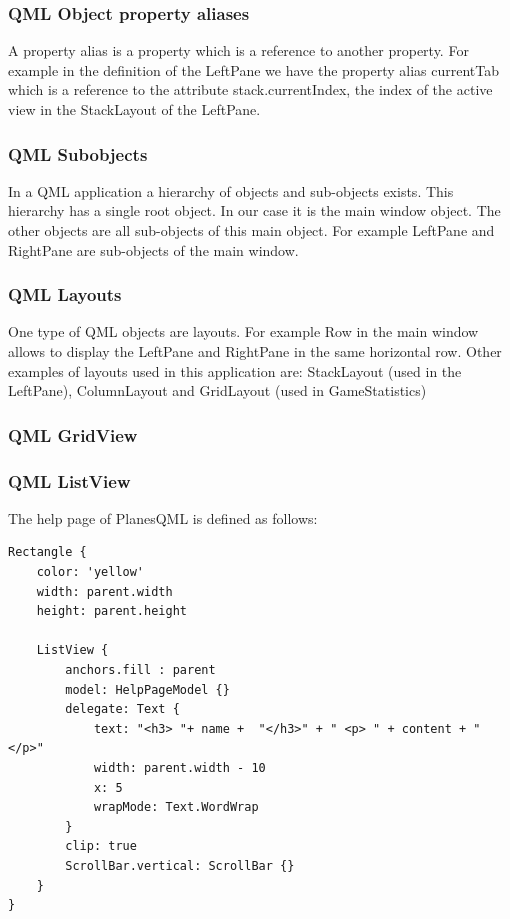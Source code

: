 \subsubsection {QML Object property aliases}

A property alias is a property which is a reference to another property. For example in the definition of the LeftPane we have the property alias currentTab which is a reference to the attribute stack.currentIndex, the index of the active view in the StackLayout of the LeftPane. 

\subsubsection {QML Subobjects}

In a QML application a hierarchy of objects and sub-objects exists. This hierarchy has a single root object. In our case it is the main window object. The other objects are all sub-objects of this main object. 
For example LeftPane and RightPane are sub-objects of the main window. 

\subsubsection {QML Layouts}

One type of QML objects are layouts. For example Row in the main window allows to display the LeftPane and RightPane in the same horizontal row. Other examples of layouts used in this application are: StackLayout (used in the LeftPane), ColumnLayout and GridLayout (used in GameStatistics)

\subsubsection {QML GridView}

\subsubsection {QML ListView}

The help page of PlanesQML is defined as follows:

\begin{lstlisting}
Rectangle {
	color: 'yellow'
	width: parent.width
	height: parent.height
	
	ListView {
		anchors.fill : parent 
		model: HelpPageModel {}
		delegate: Text {
			text: "<h3> "+ name +  "</h3>" + " <p> " + content + " </p>"
			width: parent.width - 10
			x: 5
			wrapMode: Text.WordWrap
		}
		clip: true
		ScrollBar.vertical: ScrollBar {}
	}
}
\end{lstlisting}

